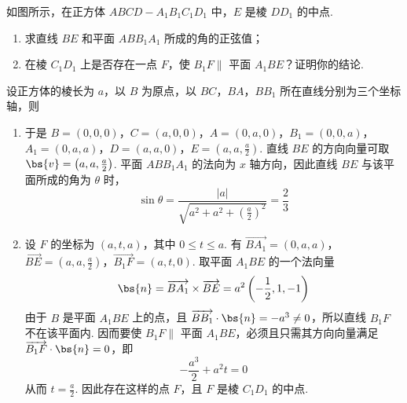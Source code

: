 \begin{problem}
如图所示，在正方体 \(ABCD - A_{1}B_{1}C_{1}D_{1}\) 中，\(E\) 是棱 \(DD_{1}\) 的中点.

\begin{enumerate}
\item 求直线 \(BE\) 和平面 \(ABB_{1}A_{1}\) 所成的角的正弦值；
\item 在棱 \(C_{1}D_{1}\) 上是否存在一点 \(F\)，使 \(B_{1}F \parallel\) 平面 \(A_{1}BE\)？证明你的结论.
\end{enumerate}


\begin{solution}
设正方体的棱长为 \(a\)，以 \(B\) 为原点，以 \(BC\)，\(BA\)，\(BB_{1}\) 所在直线分别为三个坐标轴，则
\begin{enumerate}
\item 于是 \(B=\left(0,0,0\right)\)，\(C=\left(a,0,0\right)\)，\(A=\left(0,a,0\right)\)，\(B_{1}=\left(0,0,a\right)\)，\(A_{1}=\left(0,a,a\right)\)，\(D=\left(a,a,0\right)\)，\(E=\left(a,a,\frac{a}{2}\right)\). 直线 \(BE\) 的方向向量可取 \(\bs{v}=\left(a,a,\frac{a}{2}\right)\). 平面 \(ABB_{1}A_{1}\) 的法向为 \(x\) 轴方向，因此直线 \(BE\) 与该平面所成的角为 \(\theta\) 时，
\[
\sin\theta=\frac{|a|}{\sqrt{a^2+a^2+\left(\frac{a}{2}\right)^2}}=\frac{2}{3}
\]
\item 设 \(F\) 的坐标为 \(\left(a,t,a\right)\)，其中 \(0\leqslant t\leqslant a\). 有 \(\overrightarrow{BA_{1}}=\left(0,a,a\right)\)，\(\overrightarrow{BE}=\left(a,a,\frac{a}{2}\right)\)，\(\overrightarrow{B_{1}F}=\left(a,t,0\right)\).
取平面 \(A_{1}BE\) 的一个法向量
\[
\bs{n}=\overrightarrow{BA_{1}}\times\overrightarrow{BE}=a^2\left(-\frac{1}{2},1,-1\right)
\]
由于 \(B\) 是平面 \(A_{1}BE\) 上的点，且
\(\overrightarrow{BB_{1}}\cdot\bs{n}=-a^3\ne0\)，所以直线 \(B_{1}F\) 不在该平面内. 因而要使 \(B_{1}F\parallel\) 平面 \(A_{1}BE\)，必须且只需其方向向量满足 \(\overrightarrow{B_{1}F}\cdot\bs{n}=0\)，即
\[
-\frac{a^3}{2}+a^2t=0
\]
从而 \(t=\frac{a}{2}\). 因此存在这样的点 \(F\)，且 \(F\) 是棱 \(C_{1}D_{1}\) 的中点.
\end{enumerate}
\end{solution}
\end{problem}

